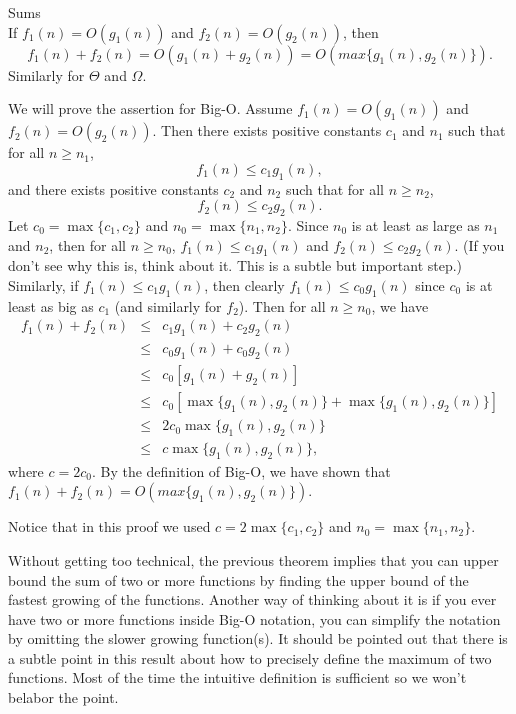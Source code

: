 \begin{thm}\label{thm:asyprops3}
Sums\\
 If $f_{1}(n) = O(g_{1}(n))$ and $f_{2}(n) = O(g_{2}(n))$,
then 
$$f_{1}(n)+f_{2}(n) = O(g_{1}(n)+g_{2}(n))=O(max\{g_{1}(n),g_{2}(n)\}).$$
Similarly for $\Theta$ and $\Omega$.
\begin{pf}
We will prove the assertion for Big-O.
Assume $f_{1}(n) = O(g_{1}(n))$ and $f_{2}(n) = O(g_{2}(n))$.
Then there exists positive constants $c_1$ and $n_1$ such that for all $n\geq n_1$, 
$$f_1(n)\leq c_1g_1(n),$$
and there exists positive constants $c_2$ and $n_2$ such that for all $n\geq n_2$, 
$$f_2(n)\leq c_2g_2(n).$$
Let $c_0=\max\{c_1,c_2\}$ and $n_0=\max\{n_1,n_2\}$.
Since $n_0$ is at least as large as $n_1$ and $n_2$, then for all $n\geq n_0$, 
$f_1(n)\leq c_1g_1(n)$ and $f_2(n)\leq c_2g_2(n)$.
(If you don't see why this is, think about it.  This is a subtle but important step.)
Similarly, if $f_1(n)\leq c_1g_1(n)$, then clearly $f_1(n)\leq c_0g_1(n)$ since
$c_0$ is at least as big as $c_1$ (and similarly for $f_2$).
Then for all $n\geq n_0$, we have
\begin{eqnarray*}
f_1(n)+f_2(n)&\leq& c_1g_1(n)+c_2g_2(n)\\
&\leq& c_0g_1(n)+c_0g_2(n)\\
&\leq& c_0[g_1(n)+g_2(n)]\\
&\leq& c_0[\max\{g_1(n),g_2(n)\}+\max\{g_1(n),g_2(n)\}]\\
&\leq& 2c_0\max\{g_1(n),g_2(n)\}\\
&\leq& c\max\{g_1(n),g_2(n)\},
\end{eqnarray*}
where $c=2c_0$.
By the definition of Big-O, we have shown that $f_{1}(n)+f_{2}(n)=O(max\{g_{1}(n),g_{2}(n)\})$.
\end{pf}
Notice that in this proof we used $c=2\max\{c_1,c_2\}$ and $n_0=\max\{n_1,n_2\}$.
\end{thm}

Without getting too technical,
the previous theorem implies that you can upper bound
the sum of two or more functions by finding the upper bound of the fastest growing 
of the functions.  
Another way of thinking about it is if you ever have two or more functions inside Big-O notation,
you can simplify the notation by omitting the slower growing function(s).
It should be pointed out that there is a subtle point in this result about how to 
precisely define the maximum of two functions.  Most of the time the intuitive
definition is sufficient so we won't belabor the point.  

